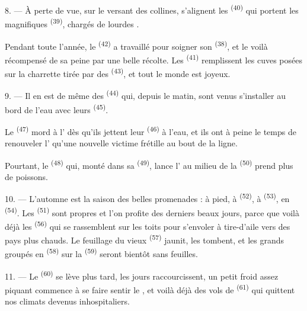 8. --- À perte de vue, sur le versant des collines, s'alignent les
 \textsuperscript{(40)} qui portent les magnifiques  \textsuperscript{(39)}, chargés de lourdes .

Pendant toute l'année, le  \textsuperscript{(42)} a travaillé
pour soigner son  \textsuperscript{(38)}, et le voilà
récompensé de sa peine par une belle récolte. Les 
\textsuperscript{(41)} remplissent les cuves posées sur la charrette tirée par
des  \textsuperscript{(43)}, et tout le monde est joyeux.

\VUsaut{5.0mm}
\VUsaut{3.4mm}

9. --- Il en est de même des  \textsuperscript{(44)}
qui, depuis le matin, sont venus s'installer au bord de l'eau avec leurs
 \textsuperscript{(45)}.

Le  \textsuperscript{(47)} mord à l' dès qu'ils
jettent leur  \textsuperscript{(46)} à l'eau, et ils ont à peine
le temps de renouveler l' qu'une nouvelle victime frétille au bout
de la ligne.

Pourtant, le  \textsuperscript{(48)} qui, monté dans sa
 \textsuperscript{(49)}, lance l' au milieu de
la  \textsuperscript{(50)} prend plus de poissons.

10. --- L'automne est la saison des belles promenades : à pied, à
 \textsuperscript{(52)}, à  \textsuperscript{(53)},
en  \textsuperscript{(54)}. Les 
\textsuperscript{(51)} sont propres et l'on profite des derniers beaux jours,
parce que voilà déjà les  \textsuperscript{(56)} qui se
rassemblent sur les toits pour s'envoler à tire-d'aile vers des pays plus
chauds. Le feuillage du vieux  \textsuperscript{(57)} jaunit, les
 tombent, et les grands  groupés en
 \textsuperscript{(58)} sur la 
\textsuperscript{(59)} seront bientôt sans feuilles.

11. --- Le  \textsuperscript{(60)} se lève plus tard, les jours
raccourcissent, un petit froid assez piquant commence à se faire sentir le
, et voilà déjà des vols de 
\textsuperscript{(61)} qui quittent nos climats devenus inhospitaliers.
\VUsaut{6.0mm}
\VUfilet{22mm}
